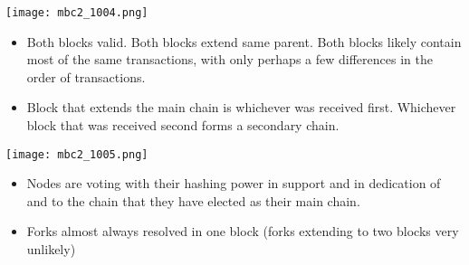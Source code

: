 \documentclass[english, 11pt]{article}
\begin{document}
\begin{tcolorbox}
\begin{minipage}{0.45\linewidth}
    \texttt{[image: mbc2\_1004.png]}
    \label{fig:fig1}  
\end{minipage}\hfil
\begin{minipage}{0.45\linewidth}
\begin{itemize}
    \item Both blocks valid. Both blocks extend same parent. Both blocks likely contain most of the same transactions, with only perhaps a few differences in the order of transactions.
    \item Block that extends the main chain is whichever was received first. Whichever block that was received second forms a secondary chain.
\end{itemize}
\end{minipage}
\end{tcolorbox}

\begin{tcolorbox}
\begin{minipage}{0.45\linewidth}
    \texttt{[image: mbc2\_1005.png]}
    \label{fig:fig1}  
\end{minipage}\hfil
\begin{minipage}{0.45\linewidth}
\begin{itemize}
    \item Nodes are voting with their hashing power in support and in dedication of and to the chain that they have elected as their main chain. 
    \item Forks almost always resolved in one block (forks extending to two blocks very unlikely)
\end{itemize}
\end{minipage}
\end{tcolorbox}
\end{document}
